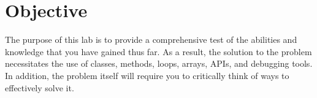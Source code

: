 \section{Objective}

The purpose of this lab is to provide a comprehensive test of the abilities and knowledge that you have gained thus far.
As a result, the solution to the problem necessitates the use of classes, methods, loops, arrays, APIs, and debugging tools.
In addition, the problem itself will require you to critically think of ways to effectively solve it.
